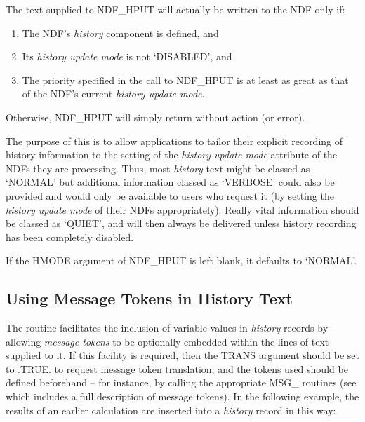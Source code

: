 \documentclass[twoside,11pt,nolof]{starlink}
\providecommand{\st}[1]{{\emph{#1}}}
\begin{document}
The text supplied to NDF\_HPUT will actually be written to the NDF
only if:

\begin{enumerate}

\item The NDF's \st{history\/} component is defined, and

\item Its \st{history update mode\/} is not `DISABLED', and

\item The priority specified in the call to NDF\_HPUT is at least as great as
that of the NDF's current \st{history update mode}.

\end{enumerate}

Otherwise, NDF\_HPUT will simply return without action (or error).

The purpose of this is to allow applications to tailor their explicit
recording of history information to the setting of the \st{history
update mode\/} attribute of the NDFs they are processing.  Thus, most
\st{history\/} text might be classed as `NORMAL' but additional information
classed as `VERBOSE' could also be provided and would only be
available to users who request it (by setting the \st{history update
mode\/} of their NDFs appropriately).  Really vital information should
be classed as `QUIET', and will then always be delivered unless
history recording has been completely disabled.

If the HMODE argument of NDF\_HPUT is left blank, it defaults to
`NORMAL'.

\subsection{Using Message Tokens in History Text}

The  routine facilitates the inclusion of variable values in
\st{history\/} records by allowing \st{message tokens\/} to be optionally
embedded within the lines of text supplied to it. If this facility is
required, then the TRANS argument should be set to .TRUE. to request
message token translation, and the tokens used should be defined
beforehand -- for instance, by calling the appropriate MSG\_ routines
(see  which includes a full description of
message tokens). In the following example, the results of an earlier
calculation are inserted into a \st{history\/} record in this way:
\end{document}
